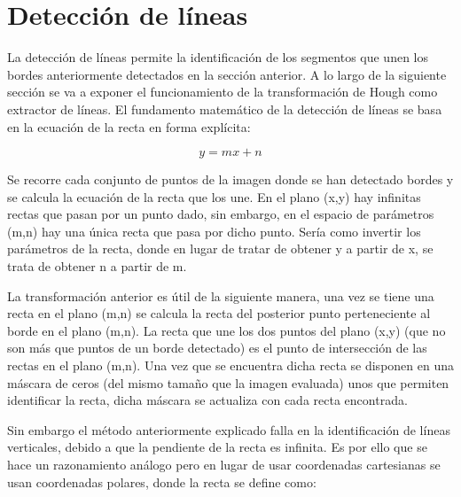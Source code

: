 \documentclass[a4paper,12pt]{article}
\begin{document}
{\newpage


\section{Detección de líneas}


\vspace{1cm}

La detección de líneas permite la identificación de los segmentos que unen los bordes anteriormente detectados en la sección anterior.
A lo largo de la siguiente sección se va a exponer el funcionamiento de la transformación de Hough como extractor de líneas. 
El fundamento matemático de la detección de líneas se basa en la ecuación de la recta en forma explícita:

\vspace{0.5cm}

\begin{equation}
    y = mx + n
\end{equation}

\vspace{0.5cm}

Se recorre cada conjunto de puntos de la imagen donde se han detectado bordes y se calcula la ecuación de la recta que los une. En el plano (x,y)
hay infinitas rectas que pasan por un punto dado, sin embargo, en el espacio de parámetros (m,n) hay una única recta que pasa por dicho punto. Sería
como invertir los parámetros de la recta, donde en lugar de tratar de obtener y a partir de x, se trata de obtener n a partir de m.

\vspace{0.5cm}

La transformación anterior es útil de la siguiente manera, una vez se tiene una recta en el plano (m,n) se calcula la recta del posterior punto
perteneciente al borde en el plano (m,n). La recta que une los dos puntos del plano (x,y) (que no son más que puntos de un borde detectado) es 
el punto de intersección de las rectas en el plano (m,n). Una vez que se encuentra dicha recta se disponen en una máscara de ceros (del mismo tamaño
que la imagen evaluada) unos que permiten identificar la recta, dicha máscara se actualiza con cada recta encontrada.

\vspace{0.5cm}

Sin embargo el método anteriormente explicado falla en la identificación de líneas verticales, debido a que la pendiente de la recta es infinita.
Es por ello que se hace un razonamiento análogo pero en lugar de usar coordenadas cartesianas se usan coordenadas polares, donde la recta se define
como:

}
\end{document}
